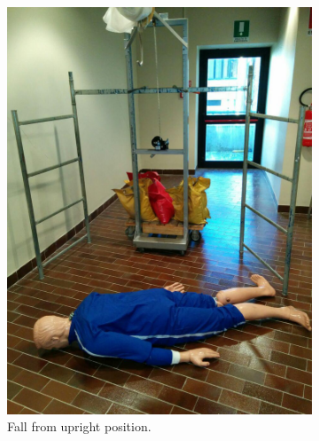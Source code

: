 \begin{figure}[t]
	\centering
	\begin{subfigure}[b]{0.40\textwidth}
		\includegraphics[width=\textwidth]{img/impalcatura.jpg}
		\caption{Fall from upright position.}\label{fig:randy_upright}
	\end{subfigure}
	\begin{subfigure}[b]{0.40\textwidth}

\end{subfigure}
\end{figure}
